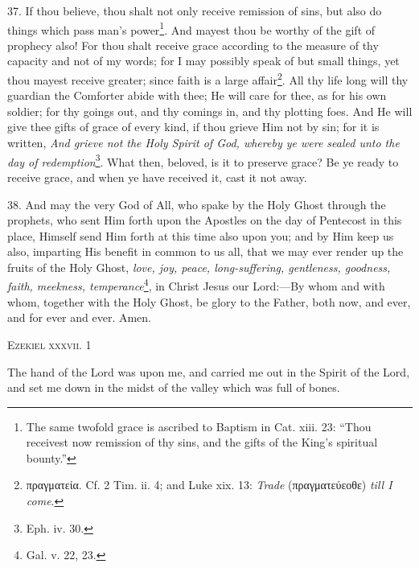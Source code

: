 37. If thou believe, thou shalt not only receive remission of sins, but also do things which pass man’s power\footnote{The same twofold grace is ascribed to Baptism in Cat. xiii. 23: “Thou receivest now remission of thy sins, and the gifts of the King’s spiritual bounty.”}. And mayest thou be worthy of the gift of prophecy also! For thou shalt receive grace according to the measure of thy capacity and not of my words; for I may possibly speak of but small things, yet thou mayest receive greater; since faith is a large affair\footnote{\textgreek{πραγματεία}. Cf. 2 Tim. ii. 4; and Luke xix. 13: \emph{Trade} (\textgreek{πραγματεύεοθε}) \emph{till I come}.}. All thy life long will thy guardian the Comforter abide with thee; He will care for thee, as for his own soldier; for thy goings out, and thy comings in, and thy plotting foes. And He will give thee gifts of grace of every kind, if thou grieve Him not by sin; for it is written, \emph{And grieve not the Holy Spirit of God, whereby ye were sealed unto the day of redemption}\footnote{Eph. iv. 30.}. What then, beloved, is it to preserve grace? Be ye ready to receive grace, and when ye have received it, cast it not away.

38. And may the very God of All, who spake by the Holy Ghost through the prophets, who sent Him forth upon the Apostles on the day of Pentecost in this place, Himself send Him forth at this time also upon you; and by Him keep us also, imparting His benefit in common to us all, that we may ever render up the fruits of the Holy Ghost, \emph{love, joy, peace, long-suffering, gentleness, goodness, faith, meekness, temperance}\footnote{Gal. v. 22, 23.}, in Christ Jesus our Lord:—By whom and with whom, together with the Holy Ghost, be glory to the Father, both now, and ever, and for ever and ever. Amen.


\textsc{Ezekiel xxxvii. 1}

The hand of the Lord was upon me, and carried me out in the Spirit of the Lord, and set me down in the midst of the valley which was full of bones.

